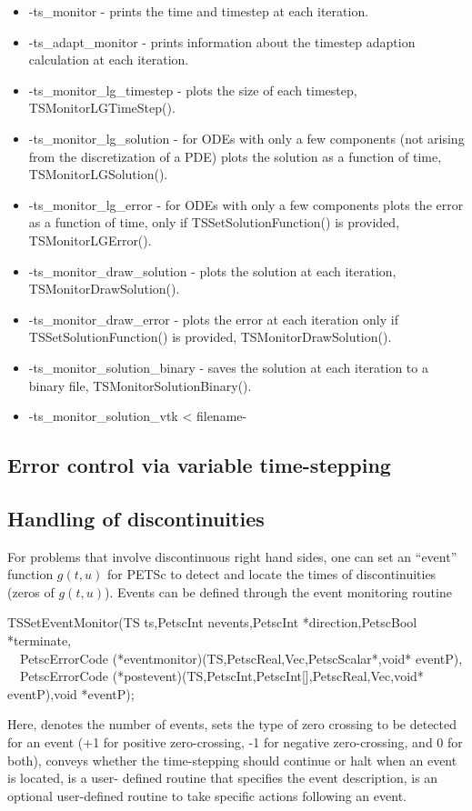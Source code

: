 \begin{itemize}
\item  -ts\_monitor - prints the time and timestep at each iteration.
\item  -ts\_adapt\_monitor - prints information about the timestep adaption calculation at each iteration.
\item  -ts\_monitor\_lg\_timestep - plots the size of each timestep, TSMonitorLGTimeStep().
\item  -ts\_monitor\_lg\_solution - for ODEs with only a few components (not arising from the discretization of a PDE) plots the solution as a function of time, TSMonitorLGSolution().
\item  -ts\_monitor\_lg\_error - for ODEs with only a few components plots the error as a function of time, only if TSSetSolutionFunction() is provided, TSMonitorLGError().
\item  -ts\_monitor\_draw\_solution - plots the solution at each iteration, TSMonitorDrawSolution().
\item  -ts\_monitor\_draw\_error - plots the error at each iteration only if TSSetSolutionFunction() is provided, TSMonitorDrawSolution().
\item  -ts\_monitor\_solution\_binary - saves the solution at each iteration to a binary file, TSMonitorSolutionBinary().
\item  -ts\_monitor\_solution\_vtk < filename-%
\end{itemize}

\subsection{Error control via variable time-stepping}

\subsection{Handling of discontinuities}

For problems that involve discontinuous right hand sides, one can set an ``event'' function 
$ g(t,u) $ for PETSc to detect and locate the times of discontinuities (zeros of $g(t,u)$). Events can be defined through the
event monitoring routine
\begin{tabbing}
     TSSetEventMonitor(TS ts,PetscInt nevents,PetscInt *direction,PetscBool *terminate, \\
     ~~PetscErrorCode (*eventmonitor)(TS,PetscReal,Vec,PetscScalar*,void* eventP), \\
     ~~PetscErrorCode (*postevent)(TS,PetscInt,PetscInt[],PetscReal,Vec,void* eventP),void *eventP);
\end{tabbing}
Here,  denotes the number of events,  sets the type of zero crossing to be detected for 
an event (+1 for positive zero-crossing, -1 for negative zero-crossing, and 0 for both),  conveys whether 
the time-stepping should continue or halt when an event is located,  is a user-
defined routine that specifies the event description,  is an optional user-defined routine to take
specific actions following an event.

